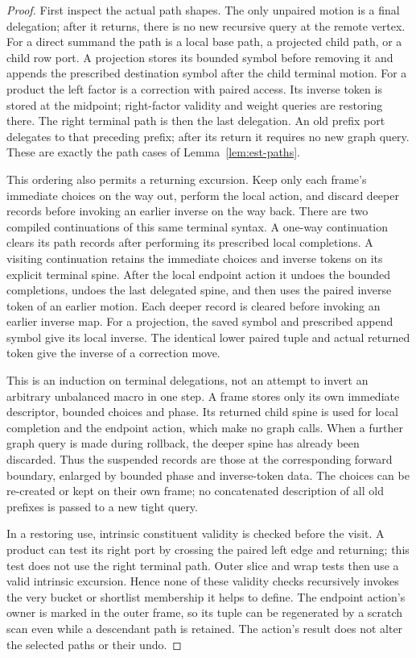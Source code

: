 \begin{proof}
First inspect the actual path shapes. The only unpaired motion is a final delegation; after it returns, there is no new recursive query at the remote vertex. For a direct summand the path is a local base path, a projected child
path, or a child row port.  A projection stores its bounded symbol
before removing it and appends the prescribed destination symbol after
the child terminal motion.  For a product the left factor is a
correction with paired access.  Its inverse token is stored at the
midpoint; right-factor validity and weight queries are restoring there.
The right terminal path is then the last delegation.  An old prefix
port delegates to that preceding prefix; after its return it requires
no new graph query.  These are exactly the path cases of
Lemma~\ref{lem:est-paths}.

This ordering also permits a returning excursion. Keep only each frame's immediate choices on the way out, perform the local action, and discard deeper records before invoking an earlier inverse on the way back. There are two compiled continuations of this same terminal syntax.  A
one-way continuation clears its path records after performing its
prescribed local completions.  A visiting continuation retains the
immediate choices and inverse tokens on its explicit terminal spine.
After the local endpoint action it undoes the bounded completions,
undoes the last delegated spine, and then uses the paired inverse token
of an earlier motion.  Each deeper record is cleared before invoking an
earlier inverse map.  For a projection, the saved symbol and prescribed
append symbol give its local inverse.  The identical lower paired tuple
and actual returned token give the inverse of a correction move.

This is an induction on terminal delegations, not an attempt to invert
an arbitrary unbalanced macro in one step.  A frame stores only its own
immediate descriptor, bounded choices and phase.  Its returned child
spine is used for local completion and the endpoint action, which make
no graph calls.  When a further graph query is made during rollback,
the deeper spine has already been discarded.  Thus the suspended
records are those at the corresponding forward boundary, enlarged by
bounded phase and inverse-token data.  The choices can be re-created or
kept on their own frame; no concatenated description of all old
prefixes is passed to a new tight query.

In a restoring use, intrinsic constituent validity is checked before
the visit.  A product can test its right port by crossing the paired
left edge and returning; this test does not use the right terminal
path.  Outer slice and wrap tests then use a valid intrinsic excursion.
Hence none of these validity checks recursively invokes the very
bucket or shortlist membership it helps to define.  The endpoint
action's owner is marked in the outer frame, so its tuple can be
regenerated by a scratch scan even while a descendant path is retained.
The action's result does not alter the selected paths or their undo.
\end{proof}

